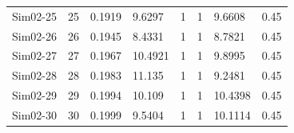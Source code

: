 \documentclass [10pt] {article}
\begin{document}
\begin{table}[H]
\begin{tabular}{c|cllllll}
		Sim02-25 & 25         & 0.1919                          & 9.6297        & 1         & 1              & 9.6608        & 0.45      \\
		Sim02-26 & 26         & 0.1945                          & 8.4331        & 1         & 1              & 8.7821        & 0.45      \\
		Sim02-27 & 27         & 0.1967                          & 10.4921       & 1         & 1              & 9.8995        & 0.45      \\
		Sim02-28 & 28         & 0.1983                          & 11.135        & 1         & 1              & 9.2481        & 0.45      \\
		Sim02-29 & 29         & 0.1994                          & 10.109        & 1         & 1              & 10.4398       & 0.45      \\
		Sim02-30 & 30         & 0.1999                          & 9.5404        & 1         & 1              & 10.1114       & 0.45     
	\end{tabular}
\end{table}
\end{document}
